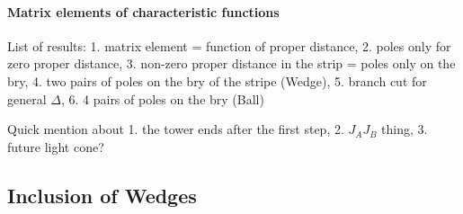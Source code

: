 \documentclass[a4paper,11pt]{article}
\theoremstyle{definition}
\theoremstyle{remark}
\newcommand{\NL}[1]{\textcolor{blue}{#1}}
\begin{document}





\paragraph{Matrix elements of characteristic functions}

List of results: 1. matrix element = function of proper distance, 2. poles only for zero proper distance, 3. non-zero proper distance in the strip = poles only on the bry, 4. two pairs of poles on the bry of the stripe (Wedge), 5. branch cut for general $\Delta$, 6. 4 pairs of poles on the bry (Ball)

Quick mention about 1. the tower ends after the first step, 2. $J_AJ_B$ thing, 3. future light cone?
\subsection{Inclusion of Wedges}
\end{document}
